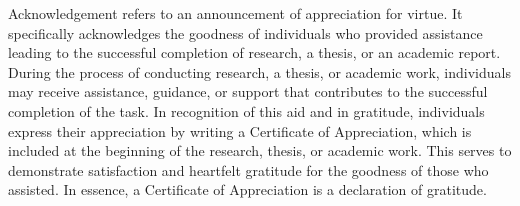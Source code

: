 Acknowledgement refers to an announcement of appreciation for virtue. It
specifically acknowledges the goodness of individuals who provided assistance leading
to the successful completion of research, a thesis, or an academic report. During the
process of conducting research, a thesis, or academic work, individuals may receive
assistance, guidance, or support that contributes to the successful completion of the
task. In recognition of this aid and in gratitude, individuals express their appreciation
by writing a Certificate of Appreciation, which is included at the beginning of the
research, thesis, or academic work. This serves to demonstrate satisfaction and
heartfelt gratitude for the goodness of those who assisted. In essence, a Certificate of
Appreciation is a declaration of gratitude.